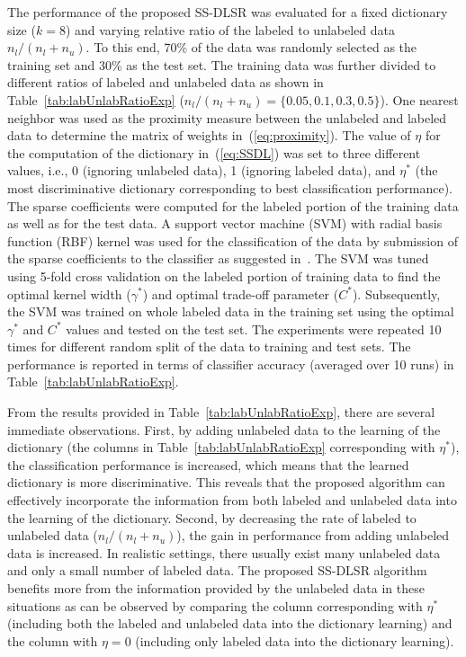 \documentclass{llncs}
\begin{document}
The performance of the proposed SS-DLSR was evaluated for a fixed dictionary size ($k=8$) and varying relative ratio of the labeled to unlabeled data $n_l/(n_l+n_u)$. To this end, 70\% of the data was randomly selected as the training set and 30\% as the test set. The training data was further divided to different ratios of labeled and unlabeled data as shown in Table~\ref{tab:labUnlabRatioExp} ($n_l/(n_l+n_u)=\{0.05, 0.1, 0.3, 0.5\}$). One nearest neighbor was used as the proximity measure between the unlabeled and labeled data to determine the matrix of weights in~(\ref{eq:proximity}). The value of $\eta$ for the computation of the dictionary in~(\ref{eq:SSDL}) was set to three different values, i.e., 0 (ignoring unlabeled data), 1 (ignoring labeled data), and $\eta^*$ (the most discriminative dictionary corresponding to best classification performance). The sparse coefficients were computed for the labeled portion of the training data as well as for the test data. A support vector machine (SVM) with radial basis function (RBF) kernel was used for the classification of the data by submission of the sparse coefficients to the classifier as suggested in~\cite{DL:Raina07}. The SVM was tuned using 5-fold cross validation on the labeled portion of training data to find the optimal kernel width ($\gamma^*$) and optimal trade-off parameter ($C^*$). Subsequently, the SVM was trained on whole labeled data in the training set using the optimal $\gamma^*$ and $C^*$ values and tested on the test set. The experiments were repeated 10 times for different random split of the data to training and test sets. The performance is reported in terms of classifier accuracy (averaged over 10 runs) in Table~\ref{tab:labUnlabRatioExp}.

From the results provided in Table~\ref{tab:labUnlabRatioExp}, there are several immediate observations. First, by adding unlabeled data to the learning of the dictionary (the columns in Table~\ref{tab:labUnlabRatioExp} corresponding with $\eta^*$), the classification performance is increased, which means that the learned dictionary is more discriminative. This reveals that the proposed algorithm can effectively incorporate the information from both labeled and unlabeled data into the learning of the dictionary. Second, by decreasing the rate of labeled to unlabeled data ($n_l/(n_l+n_u)$), the gain in performance from adding unlabeled data is increased. In realistic settings, there usually exist many unlabeled data and only a small number of labeled data. The proposed SS-DLSR algorithm benefits more from the information provided by the unlabeled data in these situations as can be observed by comparing the column corresponding with $\eta^*$ (including both the labeled and unlabeled data into the dictionary learning) and the column with $\eta=0$ (including only labeled data into the dictionary learning).
\end{document}
